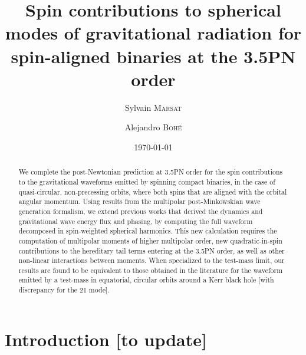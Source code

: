 \documentclass[
superscriptaddress,
preprint,
prd,tightenlines,showpacs,nofootinbib,
eqsecnum,
amsfonts,amsmath,amssymb]{revtex4-1}
\begin{document}
\title{Spin contributions to spherical modes of gravitational radiation for spin-aligned binaries at the 3.5PN order}

\author{Sylvain \textsc{Marsat}}

\author{Alejandro \textsc{Boh\'e}}

\date{\today}

\begin{abstract}
We complete the post-Newtonian prediction at 3.5PN order for the spin contributions to the gravitational waveforms emitted by spinning compact binaries, in the case of quasi-circular, non-precessing orbits, where both spins that are aligned with the orbital angular momentum. Using results from the multipolar post-Minkowskian wave generation formalism, we extend previous works that derived the dynamics and gravitational wave energy flux and phasing, by computing the full waveform decomposed in spin-weighted spherical harmonics. This new calculation requires the computation of multipolar moments of higher multipolar order, new quadratic-in-spin contributions to the hereditary tail terms entering at the 3.5PN order, as well as other non-linear interactions between moments. When specialized to the test-mass limit, our results are found to be equivalent to those obtained in the literature for the waveform emitted by a test-mass in equatorial, circular orbits around a Kerr black hole [with discrepancy for the 21 mode].
\end{abstract}


\maketitle


\section{Introduction [to update]}\label{sec:intro}
\end{document}
